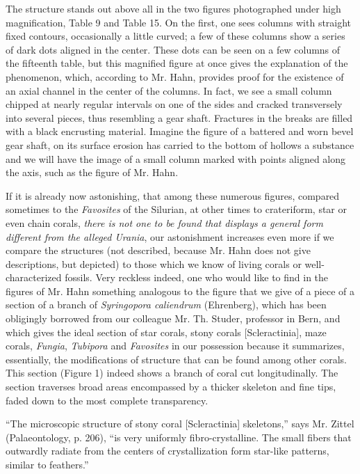 \documentclass[a4paper, 12pt, oneside]{article}
\begin{document}
The structure stands out above all in the two figures photographed under high magnification, Table 9 and Table 15. On the first, one sees columns with straight fixed contours, occasionally a little curved; a few of these columns show a series of dark dots aligned in the center. These dots can be seen on a few columns of the fifteenth table, but this magnified figure at once gives the explanation of the phenomenon, which, according to Mr. Hahn, provides proof for the existence of an axial channel in the center of the columns. In fact, we see a small column chipped at nearly regular intervals on one of the sides and cracked transversely into several pieces, thus resembling a gear shaft. Fractures in the breaks are filled with a black encrusting material. Imagine the figure of a battered and worn bevel gear shaft, on its surface erosion has carried to the bottom of hollows a substance and we will have the image of a small column marked with points aligned along the axis, such as the figure of Mr. Hahn.

If it is already now astonishing, that among these numerous figures, compared sometimes to the \emph{Favosites} of the Silurian, at other times to crateriform, star or even chain corals, \emph{there is not one to be found that displays a general form different from the alleged Urania}, our astonishment increases even more if we compare the structures (not described, because Mr. Hahn does not give descriptions, but depicted) to those which we know of living corals or well-characterized fossils. Very reckless indeed, one who would like to find in the figures of Mr. Hahn something analogous to the figure that we give of a piece of a section of a branch of \emph{Syringopora caliendrum} (Ehrenberg), which has been obligingly borrowed from our colleague Mr. Th. Studer, professor in Bern, and which gives the ideal section of star corals, stony corals [Scleractinia], maze corals, \emph{Fungia}, \emph{Tubipora} and \emph{Favosites} in our possession because it summarizes, essentially, the modifications of structure that can be found among other corals. This section (Figure 1) indeed shows a branch of coral cut longitudinally. The section traverses broad areas encompassed by a thicker skeleton and fine tips, faded down to the most complete transparency.

``The microscopic structure of stony coral [Scleractinia] skeletons,'' says Mr. Zittel (Palaeontology, p. 206), ``is very uniformly fibro-crystalline. The small fibers that outwardly radiate from the centers of crystallization form star-like patterns, similar to feathers.''
\end{document}
